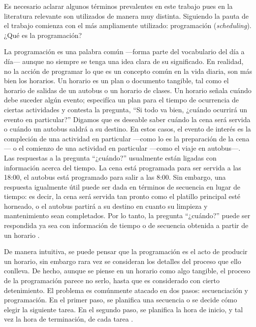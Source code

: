 \documentclass[draft,12pt,headsepline,footsepline,paper=letter]{scrreprt}
\begin{document}
Es necesario aclarar algunos términos prevalentes en este trabajo pues en la literatura relevante son utilizados de manera muy distinta. Siguiendo la pauta de \citet[p.~46]{wren95scheduling-timetabling} el trabajo comienza con el más ampliamente utilizado: programación (\textit{scheduling}). ¿Qué es la programación?

La programación es una palabra común —forma parte del vocabulario del día a día— aunque no siempre se tenga una idea clara de su significado. En realidad, no la acción de programar lo que es un concepto común en la vida diaria, son más bien los horarios. Un horario es un plan o documento tangible, tal como el horario de salidas de un autobus o un horario de clases. Un horario señala cuándo debe suceder algún evento; especifíca un plan para el tiempo de ocurrencia de ciertas actividades y contesta la pregunta, “Si todo va bien, ¿cuándo ocurrirá un evento en particular?” 
Digamos que es deseable saber cuándo la cena será servida o cuándo un autobus saldrá a su destino. En estos casos, el evento de interés es la compleción de una actividad en particular —como lo es la preparación de la cena— o el comienzo de una actividad en particular —como el viaje en autobus—.
Las respuestas a la pregunta “¿cuándo?” usualmente están ligadas con información acerca del tiempo. La cena está programada para ser servida a las 18:00, el autobus está programado para salir a las 8:00. Sin embargo, una respuesta igualmente útil puede ser dada en términos de secuencia en lugar de tiempo: es decir, la cena será servida tan pronto como el platillo principal esté horneado, o el autobus partirá a su destino en cuanto su limpieza y mantenimiento sean completados. Por lo tanto, la pregunta “¿cuándo?” puede ser respondida ya sea con información de tiempo o de secuencia obtenida a partir de un horario \citep[p.~1]{Baker2009}.

De manera intuitiva, se puede pensar que la programación es el acto de producir un horario, sin embargo rara vez se consideran los detalles del proceso que ello conlleva. De hecho, aunque se piense en un horario como algo tangible, el proceso de la programación parece no serlo, hasta que es considerado con cierto detenimiento. El problema es comúnmente atacado en dos pasos: secuenciación y programación. En el primer paso, se planifica una secuencia o se decide cómo elegir la siguiente tarea. En el segundo paso, se planifica la hora de inicio, y tal vez la hora de terminación, de cada tarea \citep[p.~2]{Baker2009}. 
\end{document}
